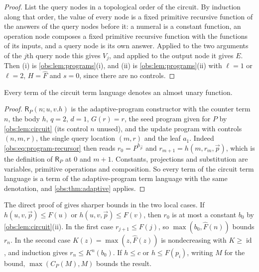 \begin{proof}
List the query nodes in a topological order of the circuit. By induction along
that order, the value of every node is a fixed primitive recursive function of
the answers of the query nodes before it: a numeral is a constant function, an
operation node composes a fixed primitive recursive function with the functions
of its inputs, and a query node is its own answer. Applied to the two arguments
of the $j$th query node this gives $V_j$, and applied to the output node it gives
$E$. Then (i) is \cref{obs:lem:programs}(i), and (ii) is
\cref{obs:lem:programs}(ii) with $\ell=1$ or $\ell=2$, $H=\widehat F$ and
$s=0$, since there are no controls.
\end{proof}

\begin{theorem}
\label{obs:thm:circuit}
Every term of the circuit term language denotes an almost unary function.
\end{theorem}

\begin{proof}
$\mathsf{R}_P(n;u,v.h)$ is the adaptive-program constructor with the counter
term $n$, the body $h$, $q=2$, $d=1$, $G(r)=r$, the seed program given for $P$
by \cref{obs:lem:circuit} (its control $n$ unused), and the update program with
controls $(n,m,r)$, the single query location $(m,r)$ and the leaf $a_1$.
Indeed \cref{obs:eq:program-recursor} then reads $r_0=P^{h_{\vec p}}$ and
$r_{m+1}=h(m,r_m,\vec p)$, which is the definition of $\mathsf{R}_P$ at $0$ and
$m+1$. Constants, projections and substitution are variables, primitive
operations and composition. So every term of the circuit term language is a
term of the adaptive-program term language with the same denotation, and
\cref{obs:thm:adaptive} applies.
\end{proof}

\begin{remark}
The direct proof of  gives sharper bounds in the two local
cases. If $h(u,v,\vec p)\le F(u)$ or $h(u,v,\vec p)\le F(v)$, then $r_0$ is at
most a constant $b_0$ by \cref{obs:lem:circuit}(ii). In the first case
$r_{j+1}\le F(j)$, so $\max(b_0,\widehat F(n))$ bounds $r_n$. In the second case
$K(z)=\max(z,\widehat F(z))$ is nondecreasing with $K\ge\operatorname{id}$, and
induction gives $r_n\le K^{n}(b_0)$. If $h\le c$ or $h\le F(p_i)$, writing $M$
for the bound, $\max(C_P(M),M)$ bounds the result.
\end{remark}

